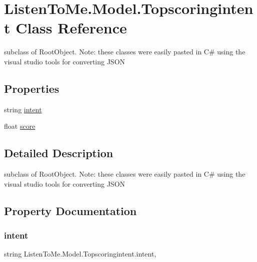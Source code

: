 \hypertarget{class_listen_to_me_1_1_model_1_1_topscoringintent}{}\section{Listen\+To\+Me.\+Model.\+Topscoringintent Class Reference}
\label{class_listen_to_me_1_1_model_1_1_topscoringintent}


subclass of Root\+Object. Note\+: these classes were easily pasted in C\# using the visual studio tools for converting J\+S\+ON  


\subsection*{Properties}
\begin{DoxyCompactItemize}
\item 
string \mbox{\hyperlink{class_listen_to_me_1_1_model_1_1_topscoringintent_a3124e191e99297ef94e0d5d5c4eac40e}{intent}}
\item 
float \mbox{\hyperlink{class_listen_to_me_1_1_model_1_1_topscoringintent_abf874e7fa0861cde6292c84eca9dc18b}{score}}
\end{DoxyCompactItemize}


\subsection{Detailed Description}
subclass of Root\+Object. Note\+: these classes were easily pasted in C\# using the visual studio tools for converting J\+S\+ON 



\subsection{Property Documentation}
\mbox{\label{class_listen_to_me_1_1_model_1_1_topscoringintent_a3124e191e99297ef94e0d5d5c4eac40e}} 
\subsubsection{\texorpdfstring{intent}{intent}}
{\footnotesize\ttfamily string Listen\+To\+Me.\+Model.\+Topscoringintent.\+intent\hspace{0.3cm}{\ttfamily [get]}, {\ttfamily [set]}}

